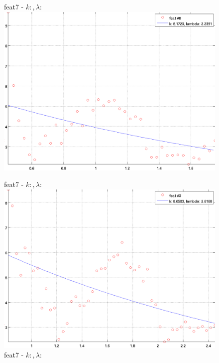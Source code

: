 \documentclass[12pt]{report}
\begin{document}
\begin{figure}
\begin{minipage}[t]{0.3\linewidth}
	feat7 - $k: , \lambda:  $\\
	\includegraphics[scale=\imFeatScale, angle=90]{images/feat8}
\end{minipage}
\begin{minipage}[t]{0.3\linewidth}
	\centering
	feat7 - $k: , \lambda:  $\\
	\includegraphics[scale=\imFeatScale, angle=90]{images/feat3}
	feat7 - $k: , \lambda:  $\\

\end{minipage}
\end{figure}
\end{document}
